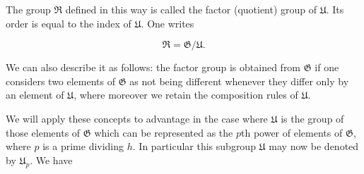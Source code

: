 The group $\mathfrak{R}$ defined in this way is called the factor (quotient) group of $\mathfrak{U}$. Its order is equal to the index of $\mathfrak{U}$. One writes

$$\mathfrak{R} = \mathfrak{G}/\mathfrak{U}.$$

We can also describe it as follows: the factor group is obtained from $\mathfrak{G}$ if one considers two elements of $\mathfrak{G}$ as not being different whenever they differ only by an element of $\mathfrak{U}$, where moreover we retain the composition rules of $\mathfrak{U}$.

We will apply these concepts to advantage in the case where $\mathfrak{U}$ is the group of those elements of $\mathfrak{G}$ which can be represented as the $p$th power of elements of $\mathfrak{G}$, where $p$ is a prime dividing $h$. In particular this subgroup $\mathfrak{U}$ may now be denoted by $\mathfrak{U}_p$. We have
